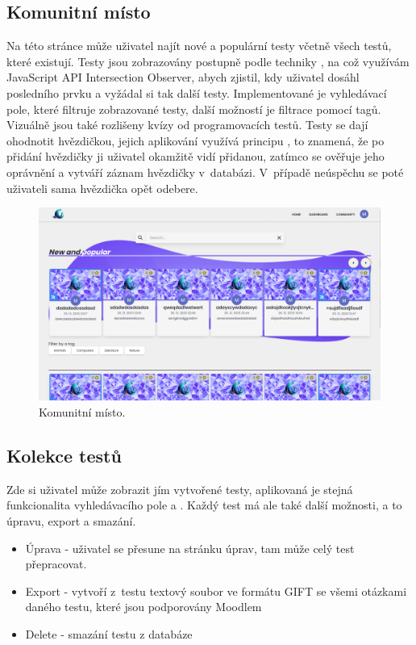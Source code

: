 \documentclass[12pt, a4paper,
openright
]{report}
\begin{document}
\subsection{Komunitní místo}
\label{subsec:community}
Na této stránce může uživatel najít nové a populární testy včetně všech testů, které existují. Testy jsou zobrazovány postupně podle techniky , na což využívám JavaScript API Intersection Observer, abych zjistil, kdy uživatel dosáhl posledního prvku a vyžádal si tak další testy. Implementované je vyhledávací pole, které filtruje zobrazované testy, další možností je filtrace pomocí tagů. Vizuálně jsou také rozlišeny kvízy od programovacích testů. Testy se dají ohodnotit hvězdičkou, jejich aplikování využívá principu , to znamená, že po přidání hvězdičky ji uživatel okamžitě vidí přidanou, zatímco se ověřuje jeho oprávnění a vytváří záznam hvězdičky v~databázi. V~případě neúspěchu se poté uživateli sama hvězdička opět odebere. 

\begin{figure}[H]
	\centering %
	\includegraphics[width=1\linewidth]{image/community.png} 
	\caption{Komunitní místo.} %
	\label{fig:community} %
\end{figure}


\subsection{Kolekce testů}
\label{subsec:collection}
Zde si uživatel může zobrazit jím vytvořené testy, aplikovaná je stejná funkcionalita vyhledávacího pole a . Každý test má ale také další možnosti, a to úpravu, export a smazání.
\begin{itemize}
	\item Úprava - uživatel se přesune na stránku úprav, tam může celý test přepracovat.
	\item Export - vytvoří z~testu textový soubor ve formátu GIFT se všemi otázkami daného testu, které jsou podporovány Moodlem
	\item Delete - smazání testu z databáze
\end{itemize}
\end{document}
